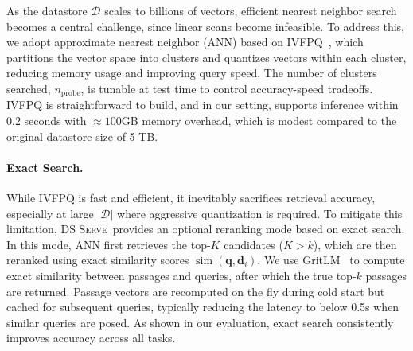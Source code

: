 \documentclass[letterpaper]{article} %
\newcommand{\sys}{\textsc{DS Serve\xspace}}%
\newcommand{\sewon}[1]{{\color{purple!70}[sewon: #1]}}
\newcommand{\yichuan}[1]{{\color{blue}[yichuan: #1]}}
\newcommand{\sewon}[1]{}
\newcommand{\yichuan}[1]{}
\begin{document}
As the datastore $\mathcal{D}$ scales to billions of vectors, efficient nearest neighbor search becomes a central challenge, since linear scans become infeasible.
To address this, we adopt approximate nearest neighbor (ANN) based on IVFPQ~\cite{ivfpq}, which partitions the vector space into clusters and quantizes vectors within each cluster, reducing memory usage and improving query speed.
The number of clusters searched, $n_{\text{probe}}$, is tunable at test time to control accuracy-speed tradeoffs.
IVFPQ is straightforward to build, and in our setting, supports inference within 0.2 seconds with $\approx100$GB memory overhead, which is modest compared to the original datastore size of 5 TB.


\vspace{-.3em}
\paragraph{Exact Search.}
While IVFPQ is fast and efficient, it inevitably sacrifices retrieval accuracy, especially at large $|\mathcal{D}|$ where aggressive quantization is required. To mitigate this limitation, \sys\ provides an optional reranking mode based on exact search. In this mode, ANN first retrieves the top-$K$ candidates ($K>k$), which are then reranked using exact similarity scores $\operatorname{sim}(\mathbf{q},\mathbf{d}_i).$
We use GritLM~\cite{muennighoff2024generative} to compute exact similarity between passages and queries, after which the true top-$k$ passages are returned. Passage vectors are recomputed on the fly during cold start but cached for subsequent queries, typically reducing the latency to below 0.5s when similar queries are posed. As shown in our evaluation, exact search consistently improves accuracy across all tasks.
\end{document}
